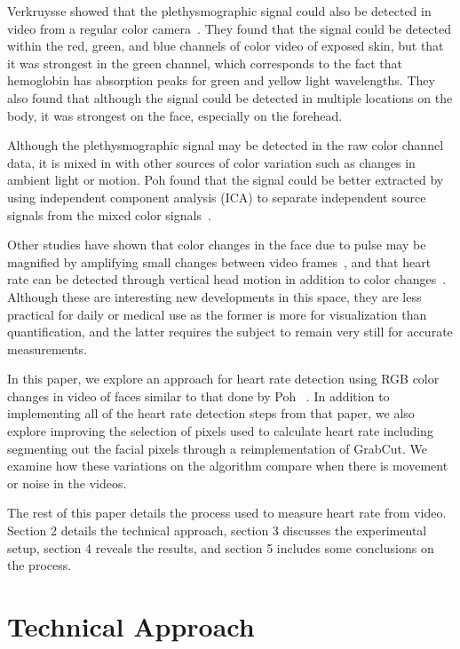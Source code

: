 \documentclass[10pt,twocolumn,letterpaper]{article}
\begin{document}
Verkruysse \etal showed that the plethysmographic signal could also be detected in video from a regular color camera~\cite{Nelson:2008aa}. They found that the signal could be detected within the red, green, and blue channels of color video of exposed skin, but that it was strongest in the green channel, which corresponds to the fact that hemoglobin has absorption peaks for green and yellow light wavelengths. They also found that although the signal could be detected in multiple locations on the body, it was strongest on the face, especially on the forehead.

Although the plethysmographic signal may be detected in the raw color channel data, it is mixed in with other sources of color variation such as changes in ambient light or motion. Poh \etal found that the signal could be better extracted by using independent component analysis (ICA) to separate independent source signals from the mixed color signals~\cite{Poh:2010aa}.

Other studies have shown that color changes in the face due to pulse may be magnified by amplifying small changes between video frames~\cite{Wu:2012aa}, and that heart rate can be detected through vertical head motion in addition to color changes~\cite{Balakrishnan:2013aa}. Although these are interesting new developments in this space, they are less practical for daily or medical use as the former is more for visualization than quantification, and the latter requires the subject to remain very still for accurate measurements.

In this paper, we explore an approach for heart rate detection using RGB color changes in video of faces similar to that done by Poh \etal~\cite{Poh:2010aa}. In addition to implementing all of the heart rate detection steps from that paper, we also explore improving the selection of pixels used to calculate heart rate including segmenting out the facial pixels through a reimplementation of GrabCut. We examine how these variations on the algorithm compare when there is movement or noise in the videos.

The rest of this paper details the process used to measure heart rate from video. Section 2 details the technical approach, section 3 discusses the experimental setup, section 4 reveals the results, and section 5 includes some conclusions on the process.

\section{Technical Approach}
\end{document}

